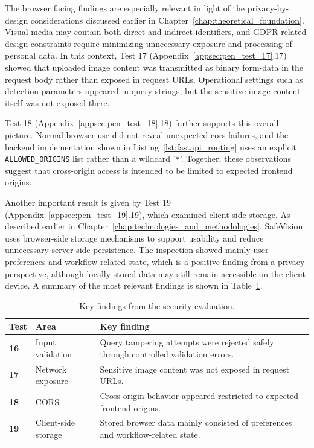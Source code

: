 The browser facing findings are especially relevant in light of the privacy-by-design considerations discussed earlier in Chapter~\ref{chap:theoretical_foundation}. Visual media may contain both direct and indirect identifiers, and GDPR-related design constraints require minimizing unnecessary exposure and processing of personal data. In this context, Test 17 (Appendix~\ref{appsec:pen_test_17}.17) showed that uploaded image content was transmitted as binary form-data in the request body rather than exposed in request URLs. Operational settings such as detection parameters appeared in query strings, but the sensitive image content itself was not exposed there.

Test 18 (Appendix~\ref{appsec:pen_test_18}.18) further supports this overall picture. Normal browser use did not reveal unexpected \acrshort{cors} failures, and the backend implementation shown in Listing~\ref{lst:fastapi_routing} uses an explicit \texttt{ALLOWED\_ORIGINS} list rather than a wildcard '\texttt{*}'. Together, these observations suggest that cross-origin access is intended to be limited to expected frontend origins.

Another important result is given by Test 19 (Appendix~\ref{appsec:pen_test_19}.19), which examined client-side storage. As described earlier in Chapter~\ref{chap:technologies_and_methodologies}, \gls{SafeVision} uses browser-side storage mechanisms to support usability and reduce unnecessary server-side persistence. The inspection showed mainly user preferences and workflow related state, which is a positive finding from a privacy perspective, although locally stored data may still remain accessible on the client device. A summary of the most relevant findings is shown in Table~\ref{tab:security_summary}.

\begin{table}[H]
\centering
\small
\begin{tabularx}{\textwidth}{|p{1.5cm}|p{4.4cm}|X|}
\hline
\textbf{Test} & \textbf{Area} & \textbf{Key finding} \\ \hline

\textbf{16} & 
Input validation & 
Query tampering attempts were rejected safely through controlled validation errors. \\ \hline

\textbf{17} & 
Network exposure & 
Sensitive image content was not exposed in request URLs. \\ \hline

\textbf{18} & 
CORS & 
Cross-origin behavior appeared restricted to expected frontend origins. \\ \hline

\textbf{19} & 
Client-side storage & 
Stored browser data mainly consisted of preferences and workflow-related state. \\ \hline

\end{tabularx}
\caption{Key findings from the security evaluation.}
\label{tab:security_summary}
\end{table}

